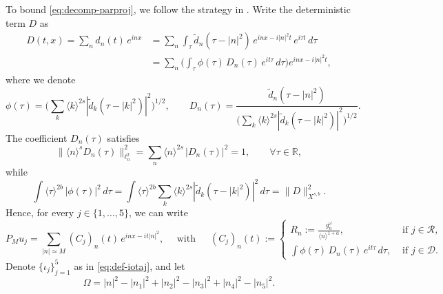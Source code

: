 \documentclass[11pt, xcolor = dvipsnames,reqno
]{amsart}
\theoremstyle{definition}
\theoremstyle{remark}
\begin{document}
To bound \eqref{eq:decomp-parproj}, we follow the strategy in \cite{Bourgain1996}. Write the deterministic term $D$ as
\begin{align}
    D(t,x) 
    = \sum_n d_n(t) \, e^{inx}
    & = \sum_n \int_\tau \widetilde d_n(\tau - |n|^2) \, e^{inx - i|n|^2 t }\, e^{i\tau t} \, d\tau \\
    & = \sum_n 
    \Big( \int_\tau  \phi(\tau) \, D_n(\tau)  \, e^{it\tau} \, d\tau \Big)
    e^{inx - i|n|^2 t },
\end{align}
where we denote
\begin{equation}
    \phi(\tau) = 
    \Big( \sum_k \langle k \rangle^{2s} | \widetilde d_k(\tau - |k|^2) |^2 \Big)^{1/2}, 
    \qquad 
    D_n(\tau) 
    = \frac{\widetilde d_n(\tau - |n|^2)}{\big( \sum_k \langle k \rangle^{2s} | \widetilde d_k(\tau - |k|^2) |^2 \big)^{1/2}}.
\end{equation}
The coefficient $D_n(\tau)$ satisfies
\begin{equation}\label{eq:Bound_Dn}
    \lVert \langle n \rangle^s D_n(\tau) \rVert_{\ell^2_n}^2
    = \sum_n \langle n \rangle^{2s}\, |D_n(\tau)|^2 = 1, 
    \qquad \forall \tau \in \mathbb R, 
\end{equation}
while 
\begin{equation}\label{eq:Norm_Of_Phi}
    \int \langle \tau \rangle^{2b} \, |\phi(\tau)|^2 \, d\tau
    = 
    \int \langle \tau \rangle^{2b} 
    \sum_k \langle k \rangle^{2s} | \widetilde d_k(\tau - |k|^2) |^2 \, d\tau
    =
    \lVert D \rVert_{X^{s,b}}^2.
\end{equation}
Hence, for every $j \in \{1, \ldots, 5\}$, we can write
\begin{equation}\label{eq:Cases_RD}
    P_M u_j 
    = 
    \sum_{|n| \simeq M } (C_j)_n(t) \, e^{inx - it|n|^2},
    \quad \text{ with } \quad \,  
    (C_j)_n(t) := 
    \left\{
    \begin{array}{ll}
        \displaystyle 
        R_n := \frac{g_n^\omega}{\langle n \rangle^{1+\alpha}}, 
        & \text{ if } j \in \mathcal R, \\
        \displaystyle
        \int  \phi(\tau) \, D_n(\tau) \,  e^{it\tau} \, d\tau, 
        & \text{ if } j \in \mathcal D.
    \end{array}
    \right.
\end{equation}
Denote $\{\iota_j\}_{j=1}^5$ as in \eqref{eq:def-iotaj}, and let
\begin{equation}
    \Omega
    = |n|^2 - |n_1|^2 + |n_2|^2 - |n_3|^2 + |n_4|^2 - |n_5|^2. 
\end{equation}
\end{document}

